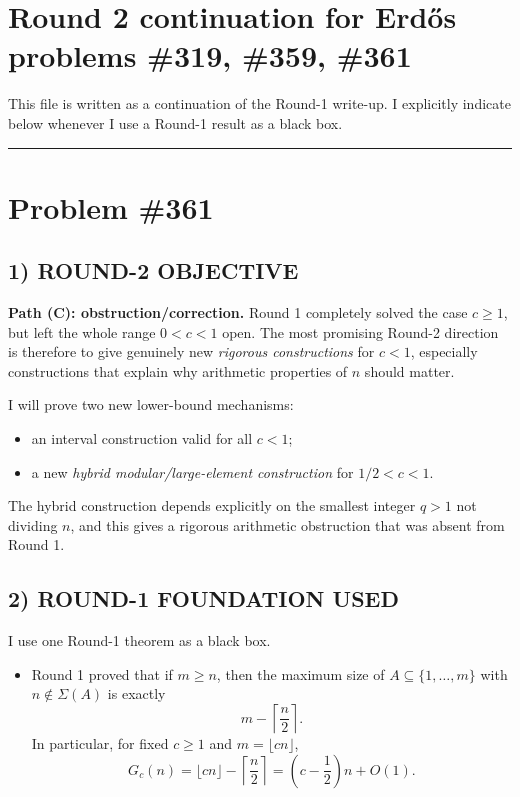 
\section*{Round 2 continuation for Erd\H{o}s problems \#319, \#359, \#361}

This file is written as a continuation of the Round-1 write-up.  I explicitly indicate below whenever I use a Round-1 result as a black box.

\bigskip
\hrule
\bigskip

\section*{Problem \#361}

\subsection*{1) ROUND-2 OBJECTIVE}
\textbf{Path (C): obstruction/correction.}  Round 1 completely solved the case $c\ge 1$, but left the whole range $0<c<1$ open.  The most promising Round-2 direction is therefore to give genuinely new \emph{rigorous constructions} for $c<1$, especially constructions that explain why arithmetic properties of $n$ should matter.

I will prove two new lower-bound mechanisms:

\begin{itemize}
\item an interval construction valid for all $c<1$;
\item a new \emph{hybrid modular/large-element construction} for $1/2<c<1$.
\end{itemize}

The hybrid construction depends explicitly on the smallest integer $q>1$ not dividing $n$, and this gives a rigorous arithmetic obstruction that was absent from Round 1.

\subsection*{2) ROUND-1 FOUNDATION USED}
I use one Round-1 theorem as a black box.

\begin{itemize}
\item Round 1 proved that if $m\ge n$, then the maximum size of $A\subseteq \{1,\dots,m\}$ with $n\notin \Sigma(A)$ is exactly
\[
m-\left\lceil \frac n2\right\rceil.
\]
In particular, for fixed $c\ge 1$ and $m=\lfloor cn\rfloor$,
\[
G_c(n)=\lfloor cn\rfloor-\left\lceil \frac n2\right\rceil
= \left(c-\frac12\right)n+O(1).
\]
\end{itemize}

